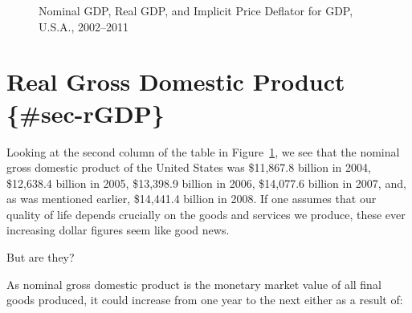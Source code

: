 \documentclass[
  letterpaper,
]{book}
\begin{document}
\begin{figure}


\caption{\label{fig-gdp-n-deflator}Nominal GDP, Real GDP, and Implicit
Price Deflator for GDP, U.S.A., 2002--2011}

\end{figure}%

\section{\texorpdfstring{Real Gross Domestic Product
\{\#sec-rGDP\}}{Real Gross Domestic Product \{\#sec-rGDP\}}}\label{real-gross-domestic-product-sec-rgdp}

Looking at the second column of the table in
Figure~\ref{fig-gdp-n-deflator}, we see that the nominal gross domestic
product of the United States was \$11,867.8 billion in 2004, \$12,638.4
billion in 2005, \$13,398.9 billion in 2006, \$14,077.6 billion in 2007,
and, as was mentioned earlier, \$14,441.4 billion in 2008. If one
assumes that our quality of life depends crucially on the goods and
services we produce, these ever increasing dollar figures seem like good
news.

But are they?

As nominal gross domestic product is the monetary market value of all
final goods produced, it could increase from one year to the next either
as a result of:
\end{document}
